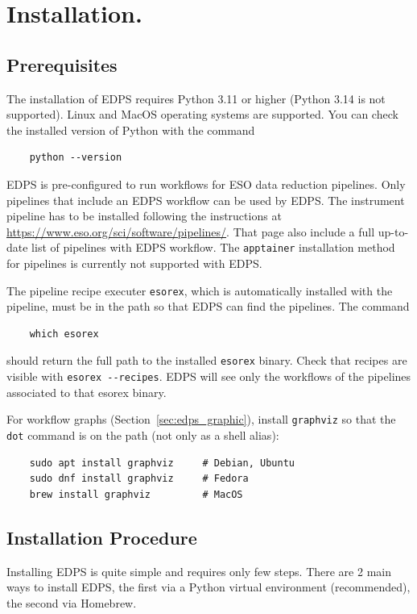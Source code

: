 
\section{Installation.}
\label{sec:edps_installation}


\subsection{Prerequisites}

The installation of EDPS requires Python 3.11 or higher (Python 3.14 is not supported). Linux and MacOS operating systems are supported. You can check the installed version of Python with the command
\begin{verbatim}
    python --version
\end{verbatim}

EDPS is pre-configured to run workflows for ESO data reduction pipelines. Only pipelines that include an EDPS workflow can be used by EDPS. The instrument pipeline has to be installed following the instructions at 
\url{https://www.eso.org/sci/software/pipelines/}. That page also include a full up-to-date list of pipelines with EDPS workflow. The {\tt apptainer} installation method for pipelines is currently not supported with EDPS.

The pipeline recipe executer {\tt esorex}, which is automatically installed with the pipeline, must be in the  path so that EDPS can find the pipelines. The command 
\begin{verbatim}
    which esorex
\end{verbatim}
 should return the full path to the installed {\tt esorex} binary. Check that recipes are visible with \verb|esorex --recipes|. EDPS will see only the workflows of the pipelines associated to that esorex binary.

For workflow graphs (Section~\ref{sec:edps_graphic}), install {\tt graphviz} so that the {\tt dot} command is on the path (not only as a shell alias):
\begin{verbatim}
    sudo apt install graphviz     # Debian, Ubuntu
    sudo dnf install graphviz     # Fedora
    brew install graphviz         # MacOS
\end{verbatim}

\subsection{Installation Procedure}
\label{sec:edps_installation_procedure}
Installing EDPS is quite simple and requires only few steps. There are 2 main ways to install EDPS, the first via a Python virtual environment (recommended), the second via Homebrew.

